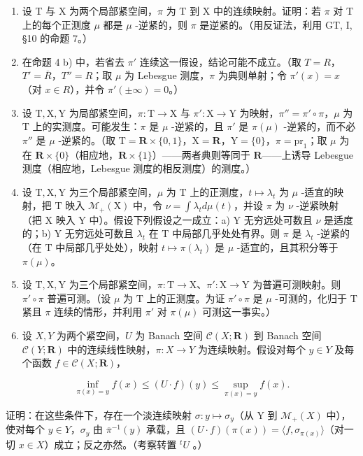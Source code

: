 \begin{enumerate}
\def\labelenumi{\arabic{enumi})}
\setcounter{enumi}{16}
\item
  设 T 与 X 为两个局部紧空间，\(\pi\) 为 T 到 X 中的连续映射。证明：若 \(\pi\) 对 T 上的每个正测度 \(\mu\) 都是 \(\mu\) -逆紧的，则 \(\pi\) 是逆紧的。（用反证法，利用 GT, I, §10 的命题 7。）
\item
  在命题 4 b) 中，若省去 \(\pi'\) 连续这一假设，结论可能不成立。（取 \(T = R\)，\(T' = \overline{R}\)，\(T'' = R\)；取 \(\mu\) 为 Lebesgue 测度，\(\pi\) 为典则单射；令 \(\pi'(x) = x\)（对 \(x \in R\)），并令 \(\pi'(\pm \infty) = 0\)。）
\item
  设 \(\mathrm{T}, \mathrm{X}, \mathrm{Y}\) 为局部紧空间，\(\pi : \mathrm{T} \to \mathrm{X}\) 与 \(\pi' : \mathrm{X} \to \mathrm{Y}\) 为映射，\(\pi'' = \pi' \circ \pi\)，\(\mu\) 为 \(\mathrm{T}\) 上的实测度。可能发生：\(\pi\) 是 \(\mu\) -逆紧的，且 \(\pi'\) 是 \(\pi(\mu)\) -逆紧的，而不必 \(\pi''\) 是 \(\mu\) -逆紧的。（取 \(\mathrm{T} = \mathbf{R} \times \{0, 1\}\)，\(\mathrm{X} = \mathbf{R}\)，\(\mathrm{Y} = \{0\}\)，\(\pi = \mathrm{pr}_1\)；取 \(\mu\) 为在 \(\mathbf{R} \times \{0\}\)（相应地，\(\mathbf{R} \times \{1\}\)）——两者典则等同于 \(\mathbf{R}\)——上诱导 Lebesgue 测度（相应地，Lebesgue 测度的相反测度）的测度。）
\item
  设 \(\mathrm{T},\mathrm{X},\mathrm{Y}\) 为三个局部紧空间，\(\mu\) 为 \(\mathrm{T}\) 上的正测度，\(t\mapsto \lambda_t\) 为 \(\mu\) -适宜的映射，把 \(\mathrm{T}\) 映入 \(\mathcal{M}_{+}(\mathrm{X})\) 中，令 \(\nu = \int \lambda_t d\mu (t)\)，并设 \(\pi\) 为 \(\nu\) -逆紧映射（把 \(\mathrm{X}\) 映入 \(\mathrm{Y}\) 中）。假设下列假设之一成立：a) \(\mathrm{Y}\) 无穷远处可数且 \(\nu\) 是适度的；b) \(\mathrm{Y}\) 无穷远处可数且 \(\lambda_t\) 在 \(\mathrm{T}\) 中局部几乎处处有界。则 \(\pi\) 是 \(\lambda_t\) -逆紧的（在 \(\mathrm{T}\) 中局部几乎处处），映射 \(t\mapsto \pi (\lambda_t)\) 是 \(\mu\) -适宜的，且其积分等于 \(\pi (\mu)\)。
\item
  设 \(\mathrm{T},\mathrm{X},\mathrm{Y}\) 为三个局部紧空间，\(\pi : \mathrm{T} \to \mathrm{X}\)、\(\pi': \mathrm{X} \to \mathrm{Y}\) 为普遍可测映射。则 \(\pi' \circ \pi\) 普遍可测。（设 \(\mu\) 为 \(\mathrm{T}\) 上的正测度。为证 \(\pi' \circ \pi\) 是 \(\mu\) -可测的，化归于 \(\mathrm{T}\) 紧且 \(\pi\) 连续的情形，并利用 \(\pi'\) 对 \(\pi(\mu)\) 可测这一事实。）
\item
  设 \(X, Y\) 为两个紧空间，\(U\) 为 Banach 空间 \(\mathcal{C}(X; \mathbf{R})\) 到 Banach 空间 \(\mathcal{C}(Y; \mathbf{R})\) 中的连续线性映射，\(\pi : X \to Y\) 为连续映射。假设对每个 \(y \in Y\) 及每个函数 \(f \in \mathcal{C}(X; \mathbf{R})\)，
\end{enumerate}

\[
\inf _ {\pi (x) = y} f (x) \leqslant (U \cdot f) (y) \leqslant \sup _ {\pi (x) = y} f (x).
\]

证明：在这些条件下，存在一个淡连续映射 \(\sigma: y \mapsto \sigma_y\)（从 Y 到 \(\mathcal{M}_+(X)\) 中），使对每个 \(y \in Y\)，\(\sigma_y\) 由 \(\overline{\pi}^{-1}(y)\) 承载，且 \((U \cdot f)(\pi(x)) = \langle f, \sigma_{\pi(x)} \rangle\)（对一切 \(x \in X\)）成立；反之亦然。（考察转置 \(^t U\) 。）

\setcounter{exercisegroup}{7}
\edef\CurrentExerciseGroup{\arabic{exercisegroup}}
